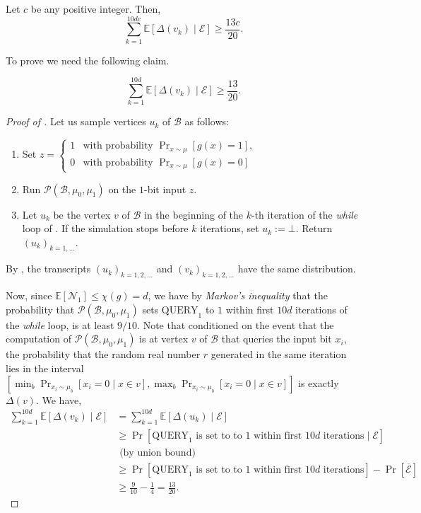 \documentclass{toc}
\newcommand{\q}{\text{QUERY}}
\newcommand{\clB}{\mathcal{B}}
\newcommand{\clE}{\mathcal{E}}
\newcommand{\clP}{\mathcal{P}}
\newcommand{\clN}{\mathcal{N}}
\newcommand{\E}{\mathbb{E}}
\begin{document}
\begin{claim}
\label{sumofdelta2}
Let $c$ be any positive integer. Then,
\[\sum_{k=1}^{10dc} \E[\Delta(v_k) \mid \clE]  \geq \frac{13c}{20}.\]
\end{claim}
To prove  we need the following claim.
\begin{claim}
\label{sumofdelta}
\[\sum_{k=1}^{10d} \E[\Delta(v_k) \mid \clE]  \geq \frac{13}{20}.\]
\end{claim}
\begin{proof}[Proof of {}]
Let us sample vertices $u_k$ of $\clB$ as follows:
\begin{enumerate}
\item Set $z=\left\{\begin{array}{ll}
1 & \mbox{with probability $\Pr_{x \sim \mu}[g(x)=1]$}, \\
0 & \mbox{with probability $\Pr_{x \sim \mu}[g(x)=0]$}
\end{array}\right.$
\item Run $\clP(\clB, \mu_0, \mu_1)$ on the $1$-bit input $z$.
\item Let $u_k$ be the vertex $v$ of $\clB$ in the beginning of the $k$-th iteration of the \emph{while} loop of . If the simulation stops before $k$ iterations, set $u_k:=\bot$. Return $(u_k)_{k=1,\ldots}$.
\end{enumerate}
By , the transcripts $(u_k)_{k=1,2,\ldots}$ and $(v_k)_{{k=1,2,\ldots}}$ have the same distribution.

Now, since $\E[\clN_1] \leq \chi(g) = d$, we have by \emph{Markov's inequality} that the probability that $\clP(\clB, \mu_0, \mu_1)$ sets $\q_1$ to $1$ within first $10d$ iterations of the \emph{while} loop, is at least $9/10$. Note that conditioned on the event that the computation of $\clP(\clB, \mu_0, \mu_1)$ is at vertex $v$ of $\clB$ that queries the input bit $x_i$, the probability that the random real number $r$ generated in the same iteration lies in the interval $[\min_b \Pr_{x_i \sim \mu_b}[x_i=0 \mid x \in v], \max_b \Pr_{x_i \sim \mu_b}[x_i=0 \mid x \in v]]$ is exactly $\Delta(v)$. We have,
\begin{align}
\sum_{k=1}^{10d} \E[\Delta(v_k) \mid \clE]&=\sum_{k=1}^{10d} \E[\Delta(u_k) \mid \clE] \nonumber \\
&\geq \Pr[\mbox{$\q_1$ is set to to $1$ within first $10d$ iterations} \mid \clE] \nonumber \\
&\mbox{\ \ \ \ \ \ \ \ \ \ \ \ \ \ \ \ (by union bound)} \nonumber \\
&\geq \Pr[\mbox{$\q_1$ is set to to $1$ within first $10d$ iterations}]-\Pr[\overline{\clE}] \nonumber \\
& \geq \frac{9}{10}-\frac{1}{4}=\frac{13}{20}. \nonumber
\end{align}
\end{proof}
\end{document}
